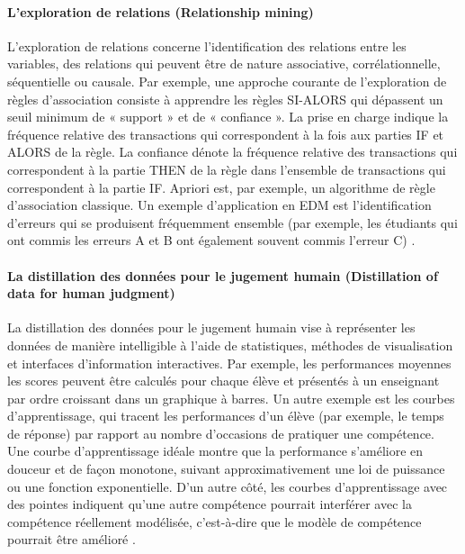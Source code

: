 \paragraph{L'exploration de relations (Relationship mining) \\}
L'exploration de relations concerne l'identification des relations entre les variables, des relations qui peuvent être de nature associative, corrélationnelle, séquentielle ou causale. Par exemple, une approche courante de l'exploration de règles d'association consiste à apprendre les règles SI-ALORS qui dépassent un seuil minimum de « support » et de « confiance ». La prise en charge indique la fréquence relative des transactions qui correspondent à la fois aux parties IF et ALORS de la règle. La confiance dénote la fréquence relative des transactions qui correspondent à la partie THEN de la règle dans l'ensemble de transactions qui correspondent à la partie IF. Apriori est, par exemple, un algorithme de règle d'association classique. Un exemple d'application en EDM est l'identification d'erreurs qui se produisent fréquemment ensemble (par exemple, les étudiants qui ont commis les erreurs A et B ont également souvent commis l'erreur C) \cite{Scheuer2012}.

\paragraph{La distillation des données pour le jugement humain (Distillation of data for human judgment) \\}
La distillation des données pour le jugement humain vise à représenter les données de manière intelligible à l'aide de statistiques, méthodes de visualisation et interfaces d'information interactives. Par exemple, les performances moyennes les scores peuvent être calculés pour chaque élève et présentés à un enseignant par ordre croissant dans un graphique à barres. Un autre exemple est les courbes d'apprentissage, qui tracent les performances d'un élève (par exemple, le temps de réponse) par rapport au nombre d'occasions de pratiquer une compétence. Une courbe d'apprentissage idéale montre que la performance s'améliore en douceur et de façon monotone, suivant approximativement une loi de puissance ou une fonction exponentielle. D'un autre côté, les courbes d'apprentissage avec des pointes indiquent qu'une autre compétence pourrait interférer avec la compétence réellement modélisée, c'est-à-dire que le modèle de compétence pourrait être amélioré \cite{Scheuer2012}.

